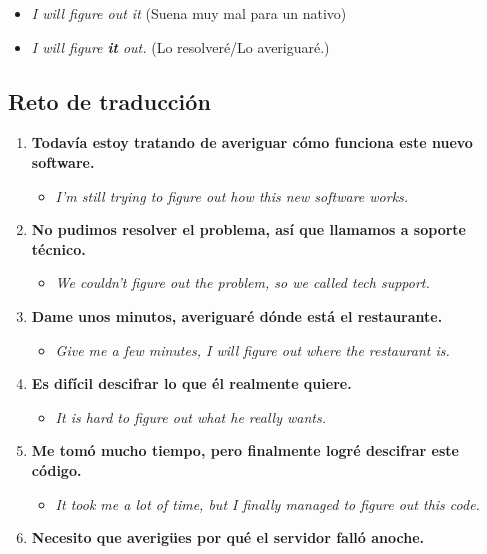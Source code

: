 \documentclass[
10pt, %
a4paper, %
oneside, %
headinclude,footinclude, %
BCOR5mm, %
]{scrartcl}
\begin{document}
\begin{itemize}
	\item \textcolor{red}{} \textit{I will figure out it} (Suena muy mal para un nativo)
	\item \textcolor{green}{} \textit{I will figure \textbf{it} out.} (Lo resolveré/Lo averiguaré.)
\end{itemize}

\subsection{Reto de traducción}
\begin{enumerate}
	\item \textbf{Todavía estoy tratando de averiguar cómo funciona este nuevo software.}
	\begin{itemize}
		\item \textit{I'm still trying to figure out how this new software works.}
	\end{itemize}
	\item \textbf{No pudimos resolver el problema, así que llamamos a soporte técnico.}
	\begin{itemize}
		\item \textit{We couldn't figure out the problem, so we called tech support.}
	\end{itemize}
	\item \textbf{Dame unos minutos, averiguaré dónde está el restaurante.}
	\begin{itemize}
		\item \textit{Give me a few minutes, I will figure out where the restaurant is.}
	\end{itemize}
	\item \textbf{Es difícil descifrar lo que él realmente quiere.}
	\begin{itemize}
		\item \textit{It is hard to figure out what he really wants.}
	\end{itemize}
	\item \textbf{Me tomó mucho tiempo, pero finalmente logré descifrar este código.}
	\begin{itemize}
		\item \textit{It took me a lot of time, but I finally managed to figure out this code.}
	\end{itemize}
	\item \textbf{Necesito que averigües por qué el servidor falló anoche.}
	\begin{itemize}

\end{itemize}
\end{enumerate}
\end{document}
